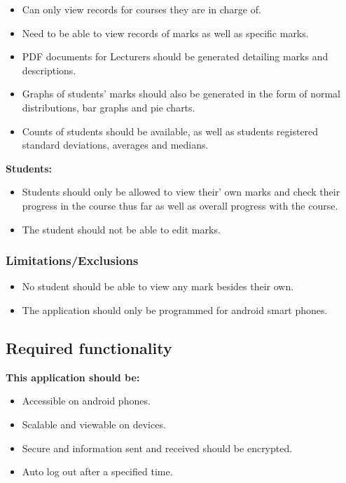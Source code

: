 \documentclass[11pt,a4paper]{article}
\begin{document}
\begin{itemize}
\item Can only view records for courses they are in charge of.
\item Need to be able to view records of marks as well as specific marks.
\item PDF documents for Lecturers should be generated detailing marks and 
descriptions.
\item Graphs of students’ marks should also be generated in the form of normal 
distributions, bar graphs and pie charts.
\item Counts of students should be available, as well as students registered standard 
deviations, averages and medians.
\end{itemize}
\textbf{Students:}
\begin{itemize}
\item Students should only be allowed to view their’ own marks and check their progress in the course thus far as well as overall progress with the course.
\item The student should not be able to edit marks.
\end{itemize}




\subsubsection{Limitations/Exclusions}
\begin{itemize}
\item No student should be able to view any mark besides their own.
\item The application should only be programmed for android smart phones.
\end{itemize}
\subsection{Required functionality}
\textbf{This application should be:}

\begin{itemize}
\item Accessible on android phones.
\item Scalable and viewable on devices.
\item Secure and information sent and received should be encrypted.
\item Auto log out after a specified time.
\end{itemize}
\end{document}
